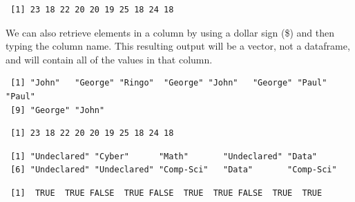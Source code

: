 \documentclass[
  letterpaper,
  DIV=11,
  numbers=noendperiod]{scrreprt}
\newenvironment{Shaded}{\begin{snugshade}}{\end{snugshade}}
\newcommand{\NormalTok}[1]{\textcolor[rgb]{0.00,0.23,0.31}{#1}}
\newcommand{\SpecialCharTok}[1]{\textcolor[rgb]{0.37,0.37,0.37}{#1}}
\begin{document}
\begin{verbatim}
 [1] 23 18 22 20 20 19 25 18 24 18
\end{verbatim}

We can also retrieve elements in a column by using a dollar sign (\$)
and then typing the column name. This resulting output will be a vector,
not a dataframe, and will contain all of the values in that column.

\begin{Shaded}
\end{Shaded}

\begin{verbatim}
 [1] "John"   "George" "Ringo"  "George" "John"   "George" "Paul"   "Paul"  
 [9] "George" "John"  
\end{verbatim}

\begin{Shaded}
\end{Shaded}

\begin{verbatim}
 [1] 23 18 22 20 20 19 25 18 24 18
\end{verbatim}

\begin{Shaded}
\end{Shaded}

\begin{verbatim}
 [1] "Undeclared" "Cyber"      "Math"       "Undeclared" "Data"      
 [6] "Undeclared" "Undeclared" "Comp-Sci"   "Data"       "Comp-Sci"  
\end{verbatim}

\begin{Shaded}
\end{Shaded}

\begin{verbatim}
 [1]  TRUE  TRUE FALSE  TRUE FALSE  TRUE  TRUE FALSE  TRUE  TRUE
\end{verbatim}
\end{document}
